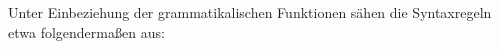 \documentclass[12pt,a4paper]{article}
\begin{document}
Unter Einbeziehung der grammatikalischen Funktionen sähen die Syntaxregeln etwa folgendermaßen aus:
\end{document}
